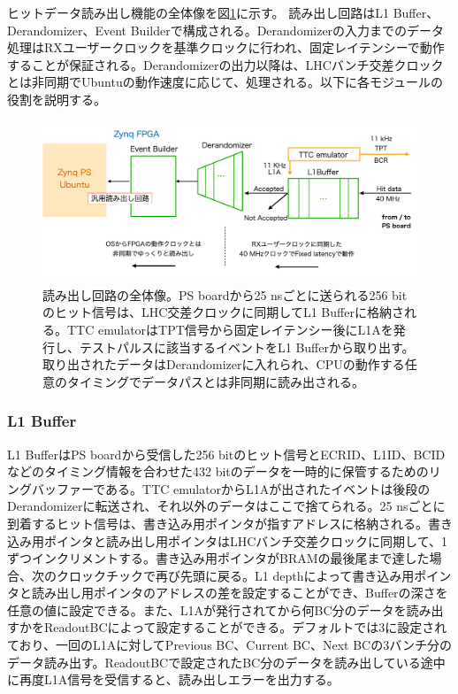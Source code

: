 ヒットデータ読み出し機能の全体像を図\ref{JATHubdaq}に示す。
読み出し回路はL1 Buffer、Derandomizer、Event Builderで構成される。Derandomizerの入力までのデータ処理はRXユーザークロックを基準クロックに行われ、固定レイテンシーで動作することが保証される。Derandomizerの出力以降は、LHCバンチ交差クロックとは非同期でUbuntuの動作速度に応じて、処理される。以下に各モジュールの役割を説明する。

\begin{figure} 
\centering
\includegraphics[width=16cm]{fig/QAQC/JATHubdaq.png}
\caption[読み出し回路の全体像]{読み出し回路の全体像。PS boardから25 nsごとに送られる256 bitのヒット信号は、LHC交差クロックに同期してL1 Bufferに格納される。TTC emulatorはTPT信号から固定レイテンシー後にL1Aを発行し、テストパルスに該当するイベントをL1 Bufferから取り出す。取り出されたデータはDerandomizerに入れられ、CPUの動作する任意のタイミングでデータパスとは非同期に読み出される。}
\label{JATHubdaq}
\end{figure}

\subsubsection{L1 Buffer} 
\baselineskip
L1 BufferはPS boardから受信した256 bitのヒット信号とECRID、L1ID、BCIDなどのタイミング情報を合わせた432 bitのデータを一時的に保管するためのリングバッファーである。TTC emulatorからL1Aが出されたイベントは後段のDerandomizerに転送され、それ以外のデータはここで捨てられる。25 nsごとに到着するヒット信号は、書き込み用ポインタが指すアドレスに格納される。書き込み用ポインタと読み出し用ポインタはLHCバンチ交差クロックに同期して、1ずつインクリメントする。書き込み用ポインタがBRAMの最後尾まで達した場合、次のクロックチックで再び先頭に戻る。L1 depthによって書き込み用ポインタと読み出し用ポインタのアドレスの差を設定することができ、Bufferの深さを任意の値に設定できる。また、L1Aが発行されてから何BC分のデータを読み出すかをReadoutBCによって設定することができる。デフォルトでは3に設定されており、一回のL1Aに対してPrevious BC、Current BC、Next BCの3バンチ分のデータ読み出す。ReadoutBCで設定されたBC分のデータを読み出している途中に再度L1A信号を受信すると、読み出しエラーを出力する。

